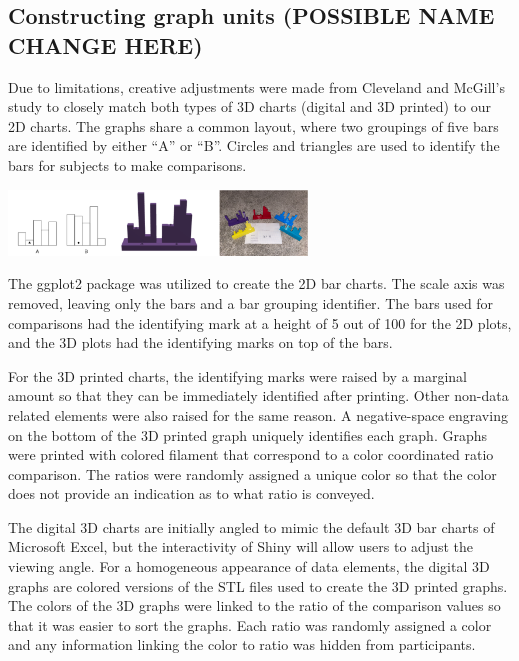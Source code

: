 \documentclass[letterpaper,inpress]{jdsart}
\begin{document}
\hypertarget{constructing-graph-units-possible-name-change-here}{%
\subsection{Constructing graph units (POSSIBLE NAME CHANGE HERE)}\label{constructing-graph-units-possible-name-change-here}}

Due to limitations, creative adjustments were made from Cleveland and McGill's study to closely match both types of 3D charts (digital and 3D printed) to our 2D charts.
The graphs share a common layout, where two groupings of five bars are identified by either ``A'' or ``B''.
Circles and triangles are used to identify the bars for subjects to make comparisons.

\includegraphics[width=3.125in,height=\textheight]{plot-types.png}

The ggplot2 package was utilized to create the 2D bar charts.
The scale axis was removed, leaving only the bars and a bar grouping identifier.
The bars used for comparisons had the identifying mark at a height of 5 out of 100 for the 2D plots, and the 3D plots had the identifying marks on top of the bars.

For the 3D printed charts, the identifying marks were raised by a marginal amount so that they can be immediately identified after printing.
Other non-data related elements were also raised for the same reason.
A negative-space engraving on the bottom of the 3D printed graph uniquely identifies each graph.
Graphs were printed with colored filament that correspond to a color coordinated ratio comparison.
The ratios were randomly assigned a unique color so that the color does not provide an indication as to what ratio is conveyed.

The digital 3D charts are initially angled to mimic the default 3D bar charts of Microsoft Excel, but the interactivity of Shiny will allow users to adjust the viewing angle.
For a homogeneous appearance of data elements, the digital 3D graphs are colored versions of the STL files used to create the 3D printed graphs.
The colors of the 3D graphs were linked to the ratio of the comparison values so that it was easier to sort the graphs.
Each ratio was randomly assigned a color and any information linking the color to ratio was hidden from participants.
\end{document}
